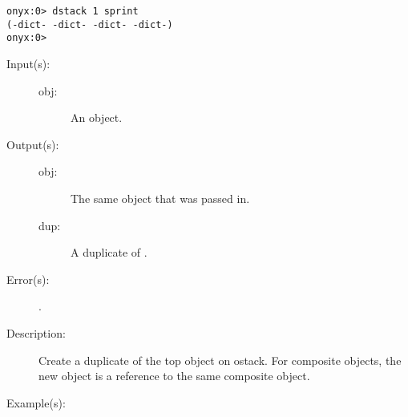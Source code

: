 \begin{description}
\begin{description}
\begin{verbatim}
onyx:0> dstack 1 sprint
(-dict- -dict- -dict- -dict-)
onyx:0>
		\end{verbatim}
	\end{description}
\label{systemdict:dup}
\item[{\onyxop{obj}{dup}{obj dup}}: ]
	\begin{description}\item[]
	\item[Input(s): ]
		\begin{description}\item[]
		\item[obj: ]
			An object.
		\end{description}
	\item[Output(s): ]
		\begin{description}\item[]
		\item[obj: ]
			The same object that was passed in.
		\item[dup: ]
			A duplicate of .
		\end{description}
	\item[Error(s): ]
		\begin{description}\item[]
		\item[.]
		\end{description}
	\item[Description: ]
		Create a duplicate of the top object on ostack.  For composite
		objects, the new object is a reference to the same composite
		object.
	\item[Example(s): ]\begin{verbatim}


\end{verbatim}
\end{description}
\end{description}
